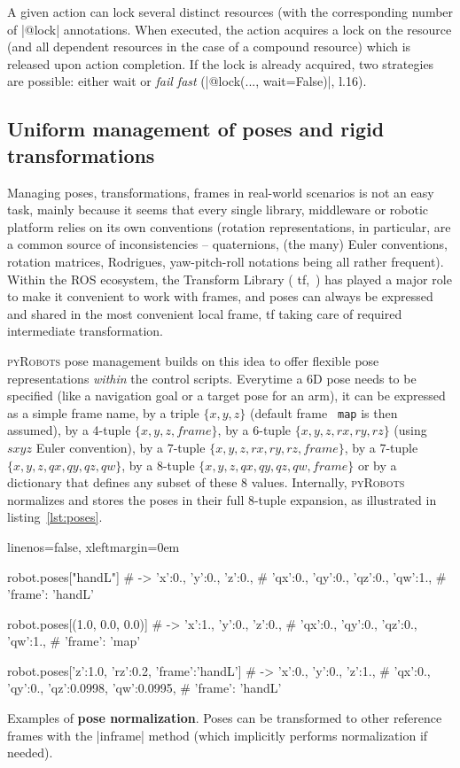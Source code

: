 \documentclass[a4paper, 10pt, conference]{ieeeconf}      %
\newcommand{\pyRobots}{\textsc{pyRobots}}
\begin{document}
A given action can lock several distinct resources (with the corresponding
number of \python|@lock| annotations. When executed, the
action acquires a lock on the resource (and all dependent resources in the case
of a compound resource) which is released upon action completion. If the lock is
already acquired, two strategies are possible: either wait or \emph{fail fast}
(\python|@lock(..., wait=False)|, l.16).


\subsection{Uniform management of poses and rigid transformations}

Managing poses, transformations, frames in real-world scenarios is not an easy
task, mainly because it seems that every single library, middleware or robotic
platform relies on its own conventions (rotation representations, in particular,
are a common source of inconsistencies -- quaternions, (the many) Euler
conventions, rotation matrices, Rodrigues, yaw-pitch-roll notations being all
rather frequent). Within the ROS ecosystem, the Transform Library ({\sc
tf},~\cite{foote2013tf}) has played a major role to make it convenient to work
with frames, and poses can always be expressed and shared in the most convenient
local frame, {\sc tf} taking care of required intermediate transformation.

\pyRobots{} pose management builds on this idea to offer flexible pose
representations \emph{within} the control scripts. Everytime a 6D pose needs to
be specified (like a navigation goal or a target pose for an arm), it can be
expressed as a simple frame name, by a triple $\{x, y, z\}$ (default frame {\tt
map} is then assumed), by a 4-tuple $\{x, y, z, frame\}$, by a 6-tuple $\{x, y,
z, rx, ry, rz\}$ (using $sxyz$ Euler convention), by a 7-tuple $\{x, y, z, rx,
ry, rz, frame\}$, by a 7-tuple $\{x, y, z, qx, qy, qz, qw\}$, by a 8-tuple $\{x,
y, z, qx, qy, qz, qw, frame\}$ or by a dictionary that defines any subset of
these 8 values.  Internally, \pyRobots{} normalizes and stores the poses in
their full 8-tuple expansion, as illustrated in listing~\ref{lst:poses}.

\begin{listing}[H]
    \begin{pythoncode*}{linenos=false, xleftmargin=0em}

    robot.poses["handL"]
    # -> {'x':0., 'y':0., 'z':0., 
    #    'qx':0., 'qy':0., 'qz':0., 'qw':1., 
    #    'frame': 'handL'}

    robot.poses[(1.0, 0.0, 0.0)]
    # -> {'x':1., 'y':0., 'z':0., 
    #    'qx':0., 'qy':0., 'qz':0., 'qw':1., 
    #    'frame': 'map'}

    robot.poses[{'z':1.0, 'rz':0.2, 'frame':'handL'}]
    # -> {'x':0., 'y':0., 'z':1., 
    #    'qx':0., 'qy':0., 'qz':0.0998, 'qw':0.0995, 
    #    'frame': 'handL'}

\end{pythoncode*}
\caption{Examples of \textbf{pose normalization}. Poses can be transformed to
other reference frames with the \python|inframe| method (which implicitly performs
normalization if needed).}
\label{lst:poses}
\end{listing}
\end{document}
